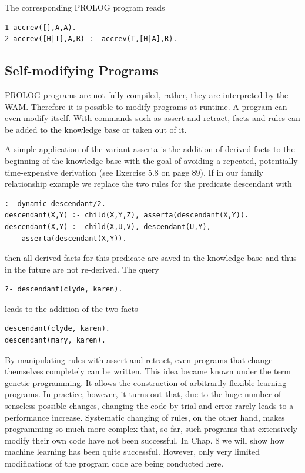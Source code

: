 \documentclass[10pt]{book}
\begin{document}
The corresponding PROLOG program reads

\begin{verbatim}
1 accrev([],A,A).
2 accrev([H|T],A,R) :- accrev(T,[H|A],R).
\end{verbatim}

\subsection*{Self-modifying Programs}
PROLOG programs are not fully compiled, rather, they are interpreted by the WAM. Therefore it is possible to modify programs at runtime. A program can even modify itself. With commands such as assert and retract, facts and rules can be added to the knowledge base or taken out of it.

A simple application of the variant asserta is the addition of derived facts to the beginning of the knowledge base with the goal of avoiding a repeated, potentially time-expensive derivation (see Exercise 5.8 on page 89). If in our family relationship example we replace the two rules for the predicate descendant with

\begin{verbatim}
:- dynamic descendant/2.
descendant(X,Y) :- child(X,Y,Z), asserta(descendant(X,Y)).
descendant(X,Y) :- child(X,U,V), descendant(U,Y),
    asserta(descendant(X,Y)).
\end{verbatim}

then all derived facts for this predicate are saved in the knowledge base and thus in the future are not re-derived. The query


\begin{verbatim}
?- descendant(clyde, karen).
\end{verbatim}

leads to the addition of the two facts

\begin{verbatim}
descendant(clyde, karen).
descendant(mary, karen).
\end{verbatim}

By manipulating rules with assert and retract, even programs that change themselves completely can be written. This idea became known under the term genetic programming. It allows the construction of arbitrarily flexible learning programs. In practice, however, it turns out that, due to the huge number of senseless possible changes, changing the code by trial and error rarely leads to a performance increase. Systematic changing of rules, on the other hand, makes programming so much more complex that, so far, such programs that extensively modify their own code have not been successful. In Chap. 8 we will show how machine learning has been quite successful. However, only very limited modifications of the program code are being conducted here.
\end{document}

